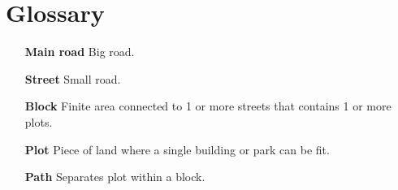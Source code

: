 \section*{Glossary}

\begin{itemize}
    \item[\textbf{Main road}]{Big road.}
    \item[\textbf{Street}]{Small road.}
    \item[\textbf{Block}]{Finite area connected to 1 or more streets that
        contains 1 or more plots.}
    \item[\textbf{Plot}]{Piece of land where a single building or park can be fit.}
    \item[\textbf{Path}]{Separates plot within a block.}
\end{itemize}

\newpage 